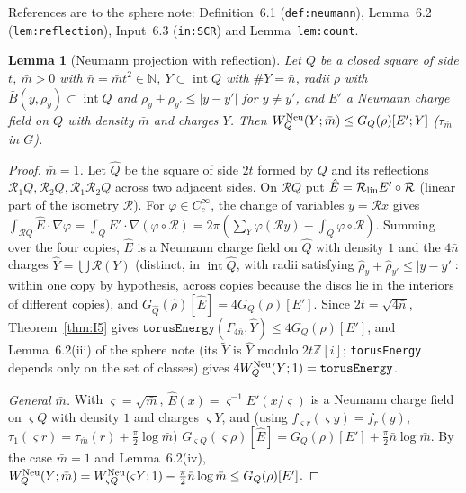 \documentclass[11pt]{article}
\newtheorem{lemma}[theorem]{Lemma}
\theoremstyle{definition}
\theoremstyle{remark}
\newcommand{\Z}{\mathbb Z}
\newcommand{\N}{\mathbb N}
\begin{document}
References are to the sphere note: Definition~6.1 (\texttt{def:neumann}), Lemma~6.2 (\texttt{lem:reflection}),
Input~6.3 (\texttt{in:SCR}) and Lemma~\texttt{lem:count}.

\begin{lemma}[Neumann projection with reflection]\label{lem:reflproj}
Let $Q$ be a closed square of side $t$, $\bar m>0$ with $\bar n=\bar mt^2\in\N$, $Y\subset\operatorname{int}Q$ with $\#Y=\bar n$, radii $\rho$ with $\bar B(y,\rho_y)\subset\operatorname{int}Q$ and $\rho_y+\rho_{y'}\le|y-y'|$ for $y\ne y'$, and $E'$ a Neumann charge field on $Q$ with density $\bar m$ and charges $Y$. Then $W^{\rm Neu}_Q(Y;\bar m)\le G_Q(\rho)[E';Y]$ ($\tau_{\bar m}$ in $G$).
\end{lemma}
\begin{proof}
\emph{$\bar m=1$.} Let $\hat Q$ be the square of side $2t$ formed by $Q$ and its reflections $\mathcal R_1Q,\mathcal R_2Q,\mathcal R_1\mathcal R_2Q$ across two adjacent sides. On
$\mathcal R Q$ put $\hat E=\mathcal R_{\rm lin}E'\circ\mathcal R$ (linear part of the isometry $\mathcal R$). For $\varphi\in C^\infty_c$, the change of variables $y=\mathcal Rx$ gives
$\int_{\mathcal RQ}\hat E\cdot\nabla\varphi=\int_QE'\cdot\nabla(\varphi\circ\mathcal R)=2\pi(\sum_Y\varphi(\mathcal Ry)-\int_Q\varphi\circ\mathcal R)$. Summing over the four copies, $\hat E$ is a
Neumann charge field on $\hat Q$ with density $1$ and the $4\bar n$ charges $\hat Y=\bigcup\mathcal R(Y)$ (distinct, in $\operatorname{int}\hat Q$, with radii satisfying $\hat\rho_y+\hat\rho_{y'}\le|y-y'|$: within one copy by hypothesis, across copies because the discs lie in the interiors of different copies), and
$G_{\hat Q}(\hat\rho)[\hat E]=4G_Q(\rho)[E']$. Since $2t=\sqrt{4\bar n}$, Theorem~\ref{thm:I5} gives $\texttt{torusEnergy}(\Gamma_{4\bar n},\hat Y)\le4G_Q(\rho)[E']$, and
Lemma~6.2(iii) of the sphere note (its $\tilde Y$ is $\hat Y$ modulo $2t\Z[i]$; \texttt{torusEnergy} depends only on the set of classes) gives $4W^{\rm Neu}_Q(Y;1)=\texttt{torusEnergy}$.

\emph{General $\bar m$.} With $\varsigma=\sqrt{\bar m}$, $\hat E(x)=\varsigma^{-1}E'(x/\varsigma)$ is a Neumann charge field on $\varsigma Q$ with density $1$ and charges $\varsigma Y$, and
(using $f_{\varsigma r}(\varsigma y)=f_r(y)$, $\tau_1(\varsigma r)=\tau_{\bar m}(r)+\frac\pi2\log\bar m$) $G_{\varsigma Q}(\varsigma\rho)[\hat E]=G_Q(\rho)[E']+\frac\pi2\bar n\log\bar m$. By the case
$\bar m=1$ and Lemma~6.2(iv), $W^{\rm Neu}_Q(Y;\bar m)=W^{\rm Neu}_{\varsigma Q}(\varsigma Y;1)-\frac\pi2\bar n\log\bar m\le G_Q(\rho)[E']$.
\end{proof}
\end{document}
